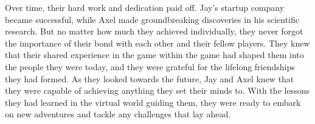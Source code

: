 \documentclass{book}%
\begin{document}
\newline%
Over time, their hard work and dedication paid off. Jay's startup company became successful, while Axel made groundbreaking discoveries in his scientific research.\newline%
\newline%
But no matter how much they achieved individually, they never forgot the importance of their bond with each other and their fellow players. They knew that their shared experience in the game within the game had shaped them into the people they were today, and they were grateful for the lifelong friendships they had formed.\newline%
\newline%
As they looked towards the future, Jay and Axel knew that they were capable of achieving anything they set their minds to. With the lessons they had learned in the virtual world guiding them, they were ready to embark on new adventures and tackle any challenges that lay ahead.%
\end{document}
